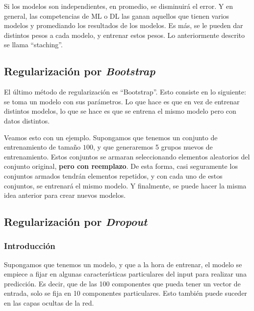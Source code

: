 Si los modelos son independientes, en promedio, se disminuirá el error. Y en general, las competencias de ML o DL las ganan aquellos que tienen varios modelos y promediando los resultados de los modelos. Es más, se le pueden dar distintos pesos a cada modelo, y entrenar estos pesos. Lo anteriormente descrito se llama ``staching''.


\subsection{Regularización por \textit{Bootstrap}}

El último método de regularización es ``Bootstrap''. Esto consiste en lo siguiente: se toma un modelo con sus parámetros. Lo que hace es que en vez de entrenar distintos modelos, lo que se hace es que se entrena el mismo modelo pero con datos distintos.

Veamos esto con un ejemplo. Supongamos que tenemos un conjunto de entrenamiento de tamaño $100$, y que generaremos 5 grupos nuevos de entrenamiento. Estos conjuntos se armaran seleccionando elementos aleatorios del conjunto original, \textbf{pero con reemplazo}. De esta forma, casi seguramente los conjuntos armados tendrán elementos repetidos, y con cada uno de estos conjuntos, se entrenará el mismo modelo. Y finalmente, se puede hacer la misma idea anterior para crear nuevos modelos.

\subsection{Regularización por \textit{Dropout}}

\subsubsection{Introducción}

Supongamos que tenemos un modelo, y que a la hora de entrenar, el modelo se empiece a fijar en algunas características particulares del input para realizar una predicción. Es decir, que de las 100 componentes que pueda tener un vector de entrada, solo se fija en 10 componentes particulares. Esto también puede suceder en las capas ocultas de la red.


